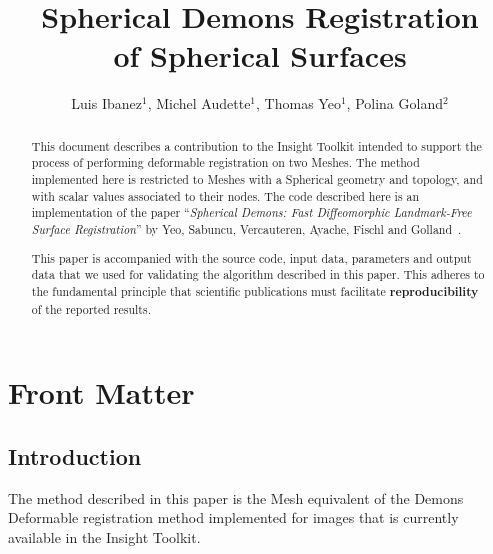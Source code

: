 \documentclass{InsightArticle}
\title{Spherical Demons Registration\\ of Spherical Surfaces}
\author{Luis Ibanez$^{1}$, Michel Audette$^{1}$, Thomas Yeo$^{1}$, Polina Goland$^{2}$}
\newcommand{\IJhandlerIDnumber}{1338}
\begin{document}
%
% 
\IJhandlefooter{\IJhandlerIDnumber}


\ifpdf
\else
\fi


\maketitle


\ifhtml
\chapter*{Front Matter\label{front}}
\fi


\begin{abstract}
\noindent
This document describes a contribution to the Insight Toolkit intended to
support the process of performing deformable registration on two Meshes. The
method implemented here is restricted to Meshes with a Spherical geometry and
topology, and with scalar values associated to their nodes. The code described
here is an implementation of the paper ``\emph{Spherical Demons: Fast
Diffeomorphic Landmark-Free Surface Registration}'' by Yeo, Sabuncu,
Vercauteren, Ayache, Fischl and Golland~\cite{Yeo2008,Yeo2009}.

This paper is accompanied with the source code, input data, parameters and
output data that we used for validating the algorithm described in this paper.
This adheres to the fundamental principle that scientific publications must
facilitate \textbf{reproducibility} of the reported results.
\end{abstract}

\tableofcontents

\section{Introduction}

The method described in this paper is the Mesh equivalent of the Demons
Deformable registration method implemented for images that is currently
available in the Insight Toolkit.
\end{document}
